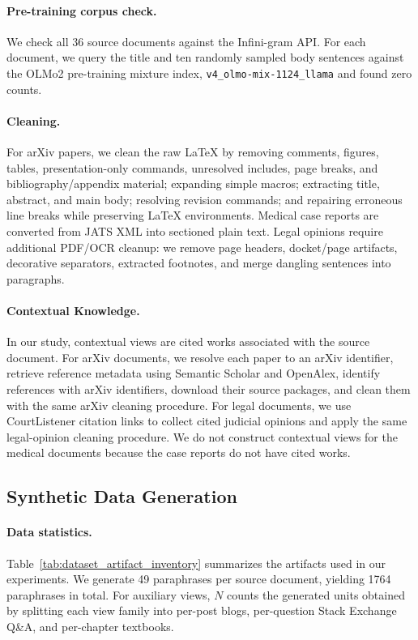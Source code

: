 \documentclass[11pt]{article}
\begin{document}
\paragraph{Pre-training corpus check.} We check all 36 source documents against the Infini-gram API.  For each document, we query the title and ten randomly sampled body sentences against the OLMo2 pre-training mixture index, \texttt{v4\_olmo-mix-1124\_llama} and found zero counts.

\paragraph{Cleaning.}
For arXiv papers, we clean the raw LaTeX by removing comments, figures, tables, presentation-only commands, unresolved includes, page breaks, and bibliography/appendix material; expanding simple macros; extracting title, abstract, and main body; resolving revision commands; and repairing erroneous line breaks while preserving LaTeX environments.  Medical case reports are converted from JATS XML into sectioned plain text.  Legal opinions require additional PDF/OCR cleanup: we remove page headers, docket/page artifacts, decorative separators, extracted footnotes, and merge dangling sentences into paragraphs.

\paragraph{Contextual Knowledge.}
In our study, contextual views are cited works associated with the source document.  For arXiv documents, we resolve each paper to an arXiv identifier, retrieve reference metadata using Semantic Scholar and OpenAlex, identify references with arXiv identifiers, download their source packages, and clean them with the same arXiv cleaning procedure.  For legal documents, we use CourtListener citation links to collect cited judicial opinions and apply the same legal-opinion cleaning procedure.  We do not construct contextual views for the medical documents because the case reports do not have cited works.

\subsection{Synthetic Data Generation}

\paragraph{Data statistics.}
Table~\ref{tab:dataset_artifact_inventory} summarizes the artifacts used in our experiments.  We generate 49 paraphrases per source document, yielding 1764 paraphrases in total.  For auxiliary views, $N$ counts the generated units obtained by splitting each view family into per-post blogs, per-question Stack Exchange Q\&A, and per-chapter textbooks. 
\end{document}
